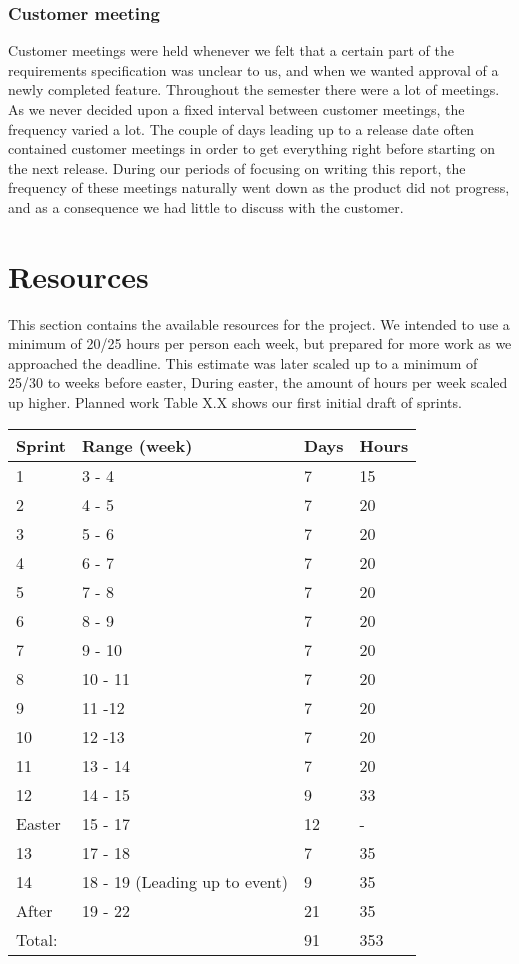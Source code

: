 \subsubsection{Customer meeting}
Customer meetings were held whenever we felt that a certain part of the
requirements specification was unclear to us, and when we wanted
approval of a newly completed feature. Throughout the semester there
were a lot of meetings. As we never decided upon a fixed interval
between customer meetings, the frequency varied a lot. The couple of
days leading up to a release date often contained customer meetings in
order to get everything right before starting on the next release.
During our periods of focusing on writing this report, the frequency of
these meetings naturally went down as the product did not progress, and
as a consequence we had little to discuss with the customer. 

\section{Resources}
This section contains the available resources for the project. We
intended to use a minimum of 20/25 hours per person each week, but
prepared for more work as we approached the deadline. This estimate was
later scaled up to a minimum of 25/30 to weeks before easter, During
easter, the amount of hours per week scaled up higher.
Planned work 
Table X.X shows our first initial draft of sprints. 

\begin{tabular}{|l|l|l|l|}
\hline
 Sprint & Range (week) & Days &
 Hours\\\hline
 1 & 3 - 4 & 7 & 15\\\hline
 2 & 4 - 5 & 7 & 20\\\hline
 3 & 5 - 6 & 7 & 20 \\\hline
 4 & 6 - 7 & 7 & 20 \\\hline
 5 & 7 - 8 & 7 & 20\\\hline
 6 & 8 - 9  & 7 & 20\\\hline
 7 & 9 - 10 & 7 & 20\\\hline
 8 & 10 - 11 & 7 & 20\\\hline
 9 & 11 -12 & 7 & 20\\\hline
 10 & 12 -13 & 7 & 20\\\hline
 11 & 13 - 14 & 7 & 20\\\hline
 12  & 14 - 15  & 9 & 33\\\hline
 Easter & 15 - 17 & 12 & {}-\\\hline
 13 & 17 - 18 & 7 & 35\\\hline
 14 & 18 - 19 (Leading up to event) & 9 & 35\\\hline
 After & 19 - 22 & 21 & 35\\\hline
 Total:  & & 91 & 353\\\hline
\end{tabular}


